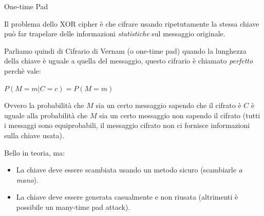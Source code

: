 \documentclass[handout, xcolor=dvipsnames,aspectratio=169]{beamer}
\begin{document}
\begin{frame}{One-time Pad}
  
  \pause
  
  Il problema dello XOR cipher è che cifrare usando ripetutamente la stessa chiave può far trapelare delle informazioni \textit{statistiche} sul messaggio originale.
  
  \medskip
  
  \pause
  Parliamo quindi di Cifrario di Vernam (o one-time pad) quando la lunghezza della chiave è uguale a quella del messaggio, questo cifrario è chiamato \textit{perfetto} perchè vale:
  
  \medskip
  
  $P(M = m | C = c) = P(M = m)$
  
  \medskip
  
  Ovvero la probabilità che $M$ sia un certo messaggio sapendo che il cifrato è $C$ è uguale alla probabilità che $M$ sia un certo messaggio non sapendo il cifrato (tutti i messaggi sono equiprobabili, il messaggio cifrato non ci fornisce informazioni sulla chiave usata).
  
  \medskip
  
  \pause

  Bello in teoria, ma:
  
  \begin{itemize}
    \item La chiave deve essere scambiata usando un metodo sicuro (scambiarle \textit{a mano}).
    \item La chiave deve essere generata casualmente e non riusata (altrimenti è possibile un many-time pad attack).
  \end{itemize}
  
\end{frame}
\end{document}
